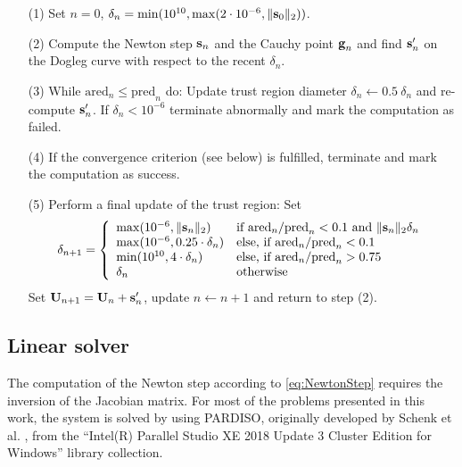 \begin{itemize}
	\item[(1)]
	Set $n=0$, $\delta_n = \min(10^{10}, \max(2 \cdot 10^{-6}, \| \textbf{s}_0 \|_2 ))$.	
	\item[(2)]
	Compute the Newton step $\textbf{s}_n$ and the Cauchy point  $\textbf{g}_n$ and
	find $\textbf{s}'_n$ on the Dogleg curve with respect to the recent $\delta_n$.	
	\item[(3)]
	While $\textrm{ared}_n \leq \textrm{pred}_n$ do:
	Update trust region diameter $\delta_n \leftarrow 0.5 \ \delta_n$
	and re-compute $\textbf{s}'_n$.
	If $\delta_n < 10^{-6}$ terminate abnormally and mark the computation as failed.	
	\item[(4)]
	If the convergence criterion (see below) is fulfilled, terminate and mark the computation as success.	
	\item[(5)]
	Perform a final update of the trust region: Set
	\[
	\delta_{n+1} = \left\{ \begin{array}{ll}
		\max( 10^{-6}, \| \textbf{s}_n \|_2 ) & \text{if } \textrm{ared}_n / \textrm{pred}_n < 0.1 \text{ and } \| \textbf{s}_n \|_2 \delta_n \\
		\max( 10^{-6}, 0.25 \cdot \delta_n )    & \text{else, if } \textrm{ared}_n / \textrm{pred}_n < 0.1                                        \\
		\min( 10^{10}, 4 \cdot \delta_n )       & \text{else, if } \textrm{ared}_n / \textrm{pred}_n > 0.75                                       \\
		\delta_{n}                              & \text{otherwise}                                                                                \\
	\end{array} \right.
	\]
	Set $\textbf{U}_{n+1} = \textbf{U}_{n} + \textbf{s}'_{n} $, update $n \leftarrow n + 1$ and return to step (2).	
\end{itemize}
\subsection{Linear solver}\label{ssec:LinearSolver}

The computation of the Newton step according to \cref{eq:NewtonStep} requires the inversion of the Jacobian matrix.  For most of the problems presented in this work, the system is solved by using  \gls{PARDISO}, originally developed by Schenk et al.  \parencite{schenkEfficientSparseLU2000,schenkTwolevelDynamicScheduling2002,schenkSolvingUnsymmetricSparse2004a},
from the ``Intel(R) Parallel Studio XE 2018 Update 3 Cluster Edition for Windows'' library collection.

